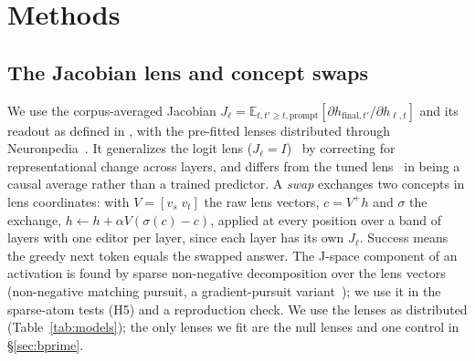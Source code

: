 \documentclass[10pt]{article}
\newcommand{\jl}{J_\ell}
\newcommand{\secref}[1]{\S\ref{#1}}
\begin{document}
\section{Methods}
\label{sec:methods}
\subsection{The Jacobian lens and concept swaps}
We use the corpus-averaged Jacobian $\jl=\mathbb{E}_{t,t'\ge t,\mathrm{prompt}}[\partial h_{\mathrm{final},t'}/\partial h_{\ell,t}]$ and its readout as defined in \citet{gurnee2026workspace}, with the pre-fitted lenses distributed through Neuronpedia~\citep{neuronpedia2026lenses}. It generalizes the logit lens ($\jl=I$)~\citep{nostalgebraist2020logit} by correcting for representational change across layers, and differs from the tuned lens~\citep{belrose2023tuned} in being a causal average rather than a trained predictor. A \emph{swap} exchanges two concepts in lens coordinates: with $V=[v_s\;v_t]$ the raw lens vectors, $c=V^{+}h$ and $\sigma$ the exchange, $h\leftarrow h+\alpha V(\sigma(c)-c)$, applied at every position over a band of layers with one editor per layer, since each layer has its own $\jl$. Success means the greedy next token equals the swapped answer. The J-space component of an activation is found by sparse non-negative decomposition over the lens vectors (non-negative matching pursuit, a gradient-pursuit variant~\citep{mallat1993matching,blumensath2008gradient}); we use it in the sparse-atom tests (H5) and a reproduction check. We use the lenses as distributed (Table~\ref{tab:models}); the only lenses we fit are the null lenses and one control in \secref{sec:bprime}.
\end{document}
